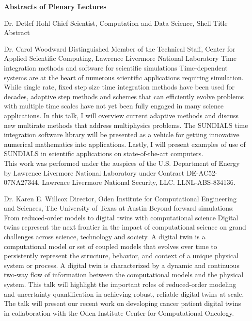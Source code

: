 \begin{center}
\label{plenary}
{\Large \bfseries Abstracts of Plenary Lectures}
\end{center}
\vspace{1ex}


\label{plenary1}
\plenabs
{Dr. Detlef Hohl}
{Chief Scientist, Computation and Data Science, Shell}
{Title}
{Abstract}
\bigskip


\label{plenary2}
\plenabs
{Dr. Carol Woodward}
{Distinguished Member of the Technical Staff, Center for Applied Scientific Computing, Lawrence Livermore National Laboratory}
{Time integration methods and software for scientific simulations}
{Time-dependent systems are at the heart of numerous scientific applications requiring simulation. While single rate, fixed step size time integration methods have been used for decades, adaptive step methods and schemes that can efficiently evolve problems with multiple time scales have not yet been fully engaged in many science applications. In this talk, I will overview current adaptive methods and discuss new multirate methods that address multiphysics problems. The SUNDIALS time integration software library will be presented as a vehicle for getting innovative numerical mathematics into applications. Lastly, I will present examples of use of SUNDIALS in scientific applications on state-of-the-art computers.\\
This work was performed under the auspices of the U.S. Department of Energy by Lawrence Livermore National Laboratory under Contract DE-AC52-07NA27344. Lawrence Livermore National Security, LLC. LLNL-ABS-834136.}
\bigskip


\label{plenary3}
\plenabs
{Dr. Karen E. Willcox}
{Director, Oden Institute for Computational Engineering and Sciences, The University of Texas at Austin}
{Beyond forward simulations: From reduced-order models to digital twins with computational science}
{Digital twins represent the next frontier in the impact of computational science on grand challenges across science, technology and society. A digital twin is a computational model or set of coupled models that evolves over time to persistently represent the structure, behavior, and context of a unique physical system or process. A digital twin is characterized by a dynamic and continuous two-way flow of information between the computational models and the physical system. This talk will highlight the important roles of reduced-order modeling and uncertainty quantification in achieving robust, reliable digital twins at scale. The talk will present our recent work on developing cancer patient digital twins in collaboration with the Oden Institute Center for Computational Oncology.}
\bigskip


